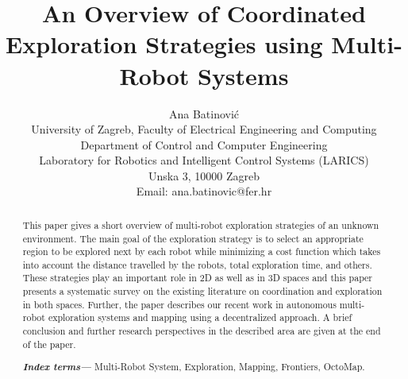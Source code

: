 \documentclass[letterpaper, 10 pt, conference]{ieeeconf}  %
\title{\LARGE \bf
    An Overview of Coordinated Exploration Strategies using Multi-Robot Systems 
}
\author{Ana Batinovi\'{c} \\
	University of Zagreb, Faculty of Electrical Engineering and Computing \\
	Department of Control and Computer Engineering\\
	Laboratory for Robotics and Intelligent Control Systems (LARICS) \\
	Unska 3, 10000 Zagreb \\
	Email: ana.batinovic@fer.hr
}
\providecommand{\indexterms}[1]{\textbf{\textit{Index terms---}} #1}
\begin{document}
\maketitle

\thispagestyle{empty}
\pagestyle{empty}


\begin{abstract}

This paper gives a short overview of multi-robot exploration strategies of an unknown environment. The main goal of the exploration strategy is to select an appropriate region to be explored next by each robot while minimizing a cost function  which takes into account the distance travelled by the robots, total exploration time, and others.
These strategies play an important role in 2D as well as in 3D spaces and this paper presents a systematic survey on the existing literature on coordination and exploration in both spaces. Further, the paper describes our recent work in autonomous multi-robot exploration systems and mapping using a decentralized approach.
A brief conclusion and further research perspectives in the described area are given at the end of the paper. 

 
\indexterms{Multi-Robot System, Exploration, Mapping, Frontiers, OctoMap.}

\end{abstract}





%









\end{document}
